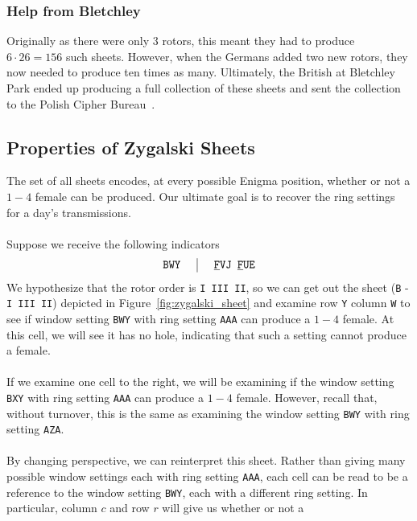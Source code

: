 \subsubsection{Help from Bletchley}
Originally as there were only $3$ rotors, this meant they had to
produce $6\cdot 26 = 156$ such sheets. However, when the Germans
added two new rotors, they now needed to produce ten times as many.
Ultimately, the British at Bletchley Park ended up producing a full
collection of these sheets and sent the collection to the Polish Cipher Bureau~\cite[p.~228]{Rejewski1981}.

\subsection{Properties of Zygalski Sheets}
The set of all sheets encodes, at every possible Enigma position,
whether or not a $1-4$ female can be produced. Our ultimate goal is
to recover the ring settings for a day's transmissions.
\\\\Suppose we receive the following indicators
\[
  \setlength{\arraycolsep}{15pt}
  \begin{array}{c | c}
    \texttt{BWY} & {\uline{\texttt{F}}}\texttt{VJ
    }{\uline{\texttt{F}}}\texttt{UE}              \\
  \end{array}
\]
We hypothesize that the rotor order is \texttt{I III II}, so we
can get out the sheet (\texttt{B} - \texttt{I III II}) depicted in
Figure~\ref{fig:zygalski_sheet} and examine row \texttt{Y} column
\texttt{W} to see if window setting \texttt{BWY} with ring
setting \texttt{AAA} can produce a $1-4$ female. At this cell, we will
see it has no hole, indicating that such a setting cannot produce a female.
\\\\If we examine one cell to the right, we will be examining if the
window setting \texttt{BXY} with ring setting \texttt{AAA} can
produce a $1-4$ female. However, recall that, without turnover, this
is the same as examining the window setting \texttt{BWY} with ring
setting \texttt{AZA}.
\\\\By changing perspective, we can reinterpret this sheet. Rather than
giving many possible window settings each with ring setting
\texttt{AAA}, each cell can be read to be a reference to the window
setting \texttt{BWY}, each with a different ring setting. In
particular, column $c$ and row $r$ will give us whether or not a
